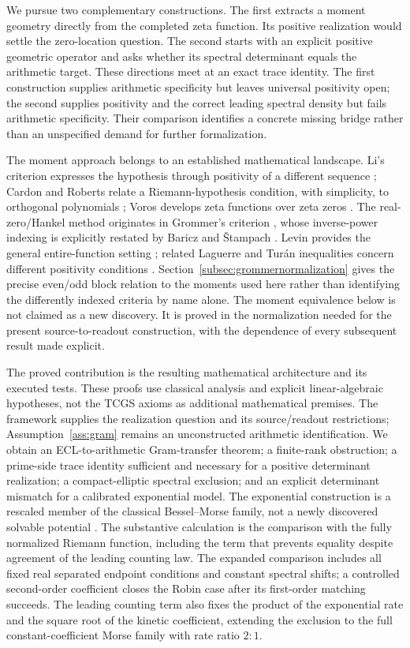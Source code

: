 \documentclass[11pt,letterpaper]{article}
\numberwithin{equation}{section}
\theoremstyle{definition}
\theoremstyle{remark}
\begin{document}
We pursue two complementary constructions. The first extracts a moment geometry directly from the completed zeta function. Its positive realization would settle the zero-location question. The second starts with an explicit positive geometric operator and asks whether its spectral determinant equals the arithmetic target. These directions meet at an exact trace identity. The first construction supplies arithmetic specificity but leaves universal positivity open; the second supplies positivity and the correct leading spectral density but fails arithmetic specificity. Their comparison identifies a concrete missing bridge rather than an unspecified demand for further formalization.

The moment approach belongs to an established mathematical landscape. Li's criterion expresses the hypothesis through positivity of a different sequence \cite{li}; Cardon and Roberts relate a Riemann-hypothesis condition, with simplicity, to orthogonal polynomials \cite{cardon}; Voros develops zeta functions over zeta zeros \cite{voros}. The real-zero/Hankel method originates in Grommer's criterion \cite{grommer}, whose inverse-power indexing is explicitly restated by Baricz and \v{S}tampach \cite[Theorem~10]{bariczstampach}. Levin provides the general entire-function setting \cite{levin}; related Laguerre and Tur\'an inequalities concern different positivity conditions \cite{cravencsordas}. Section~\ref{subsec:grommernormalization} gives the precise even/odd block relation to the moments used here rather than identifying the differently indexed criteria by name alone. The moment equivalence below is not claimed as a new discovery. It is proved in the normalization needed for the present source-to-readout construction, with the dependence of every subsequent result made explicit.

The proved contribution is the resulting mathematical architecture and its executed tests. These proofs use classical analysis and explicit linear-algebraic hypotheses, not the TCGS axioms as additional mathematical premises. The framework supplies the realization question and its source/readout restrictions; Assumption~\ref{ass:gram} remains an unconstructed arithmetic identification. We obtain an ECL-to-arithmetic Gram-transfer theorem; a finite-rank obstruction; a prime-side trace identity sufficient and necessary for a positive determinant realization; a compact-elliptic spectral exclusion; and an explicit determinant mismatch for a calibrated exponential model. The exponential construction is a rescaled member of the classical Bessel--Morse family, not a newly discovered solvable potential \cite{lagarias}. The substantive calculation is the comparison with the fully normalized Riemann function, including the term that prevents equality despite agreement of the leading counting law. The expanded comparison includes all fixed real separated endpoint conditions and constant spectral shifts; a controlled second-order coefficient closes the Robin case after its first-order matching succeeds. The leading counting term also fixes the product of the exponential rate and the square root of the kinetic coefficient, extending the exclusion to the full constant-coefficient Morse family with rate ratio $2:1$.
\end{document}
